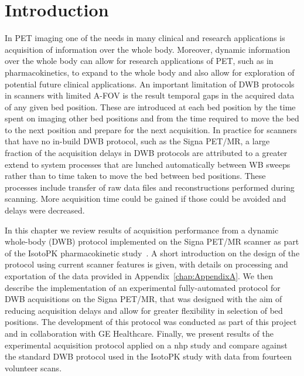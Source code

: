 \section{Introduction}
In PET imaging one of the needs in many clinical and research applications is acquisition of information over the whole body. Moreover, dynamic information over the whole body can allow for research applications of PET, such as in pharmacokinetics, to expand to the whole body and also allow for exploration of potential future clinical applications. 
An important limitation of DWB protocols in scanners with limited A-FOV is the result temporal gaps in the acquired data of any given bed position. These are introduced at each bed position by the time spent on imaging other bed positions and from the time required to move the bed to the next position and prepare for the next acquisition. 
In practice for scanners that have no in-build DWB protocol, such as the Signa PET/MR, a large fraction of the acquisition delays in DWB protocols are attributed to a greater extend to system processes that are lunched automatically between WB sweeps rather than to time taken to move the bed between bed positions. These processes include transfer of raw data files and reconstructions performed during scanning. More acquisition time could be gained if those could be avoided and delays were decreased.

In this chapter we review results of acquisition performance from a dynamic whole-body (DWB) protocol implemented on the Signa PET/MR scanner as part of the IsotoPK pharmacokinetic study~\cite{Marie2019}. A short introduction on the design of the protocol using current scanner features is given, with details on processing and exportation of the data provided in Appendix~\ref{chap:AppendixA}.
We then describe the implementation of an experimental fully-automated protocol for DWB acquisitions on the Signa PET/MR, that was designed with the aim of reducing acquisition delays and allow for greater flexibility in selection of bed positions. The development of this protocol was conducted as part of this project and in collaboration with GE Healthcare. 
Finally, we present results of the experimental acquisition protocol applied on a \gls{nhp} study and compare against the standard DWB protocol used in the IsotoPK study with data from fourteen volunteer scans.


